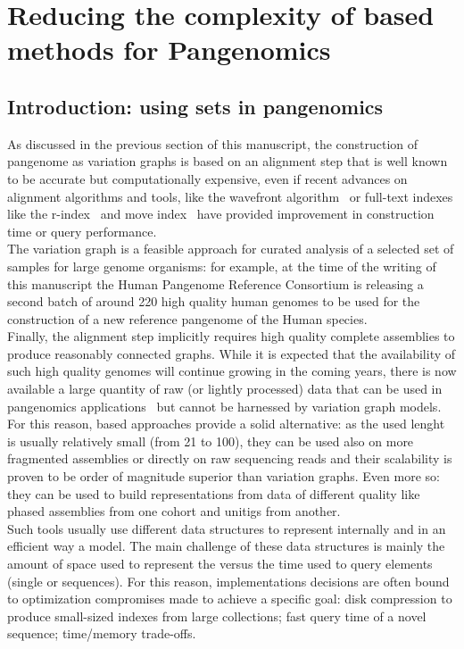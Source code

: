 \chapter{Reducing the complexity of \kmer based methods for Pangenomics}
\label{sec:complexity}

\section{Introduction: using \kmer sets in pangenomics}%
As discussed in the previous section of this manuscript, the  construction of pangenome as variation graphs is based on an alignment step that is well known to be accurate but computationally expensive, even if recent advances on alignment algorithms and tools, like the wavefront algorithm~\cite{wavefront} or full-text indexes like the r-index~\cite{spumoni2} and move index~\cite{movi} have provided improvement in construction time or query performance.\\
The variation graph is a feasible approach for curated analysis of a selected set of samples for large genome organisms: for example, at the time of the writing of this manuscript the Human Pangenome Reference Consortium is releasing a second batch of around 220 high quality human genomes to be used for the construction of a new reference pangenome of the Human species.\\
Finally, the alignment step implicitly requires high quality complete assemblies to produce reasonably connected graphs. While it is expected that the availability of such high quality genomes will continue growing in the coming years, there is now available a large quantity of raw (or lightly processed) data that can be used in pangenomics applications~\cite{serratus,logan} but cannot be harnessed by variation graph models.\\ 
For this reason, \kmer based approaches provide a solid alternative: as the used \kmer lenght is usually relatively small (from 21 to 100), they can be used also on more fragmented assemblies or directly on raw sequencing reads and their scalability is proven to be order of magnitude superior than variation graphs. Even more so: they can be used to build representations from data of different quality like phased assemblies from one cohort and unitigs from another.\\
Such tools usually use different data structures to represent internally and in an efficient way a \dbg model. The main challenge of these data structures is mainly the amount of space used to represent the \kmers versus the time used to query elements (single \kmers or sequences). For this reason, implementations decisions are often bound to optimization compromises made to achieve a specific goal: disk compression to produce small-sized indexes from large collections; fast query time of a novel sequence; time/memory trade-offs.
